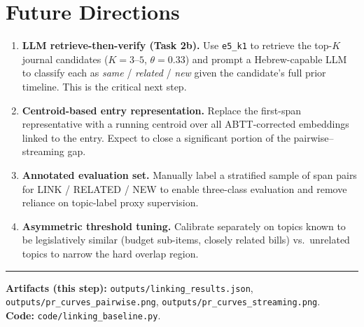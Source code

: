 \documentclass[11pt,a4paper]{article}
\begin{document}
\section{Future Directions}

\begin{enumerate}[leftmargin=1.4em]
  \item \textbf{LLM retrieve-then-verify (Task 2b).}  Use \texttt{e5\_k1} to retrieve
        the top-$K$ journal candidates ($K=3$--$5$, $\theta=0.33$) and prompt a
        Hebrew-capable LLM to classify each as \emph{same} / \emph{related} / \emph{new}
        given the candidate's full prior timeline.  This is the critical next step.
  \item \textbf{Centroid-based entry representation.}  Replace the first-span representative
        with a running centroid over all ABTT-corrected embeddings linked to the entry.
        Expect to close a significant portion of the pairwise--streaming gap.
  \item \textbf{Annotated evaluation set.}  Manually label a stratified sample of span
        pairs for LINK / RELATED / NEW to enable three-class evaluation and remove
        reliance on topic-label proxy supervision.
  \item \textbf{Asymmetric threshold tuning.}  Calibrate separately on topics known to
        be legislatively similar (budget sub-items, closely related bills) vs.\ unrelated
        topics to narrow the hard overlap region.
\end{enumerate}

\vspace{1.5em}
\hrule
\vspace{0.4em}
{\small
\textbf{Artifacts (this step):}
\texttt{outputs/linking\_results.json},
\texttt{outputs/pr\_curves\_pairwise.png},
\texttt{outputs/pr\_curves\_streaming.png}.\\
\textbf{Code:} \texttt{code/linking\_baseline.py}.
}
\end{document}

